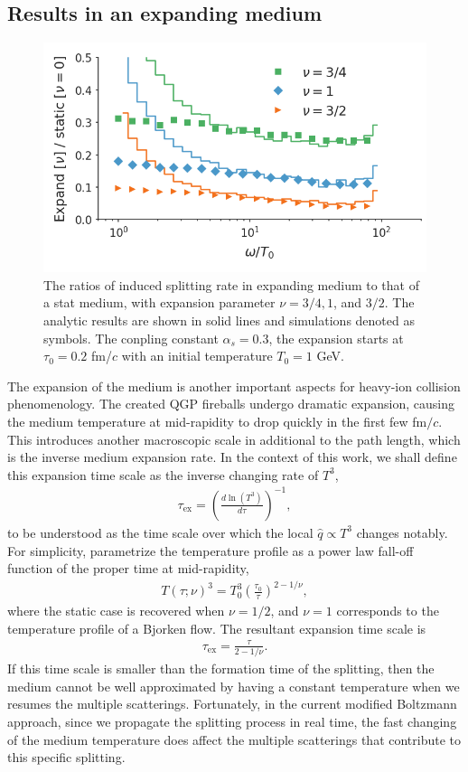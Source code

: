 \documentclass[aps, prc, reprint, amsmath, groupedaddress, nofootinbib]{revtex4-1}
\begin{document}
\subsection{Results in an expanding medium}
\begin{figure}
\includegraphics[width=\columnwidth]{spectrum_Bjorken.png}
\caption{The ratios of induced splitting rate in expanding medium to that of a stat medium, with expansion parameter $\nu = 3/4, 1$, and $3/2$. The analytic results are shown in solid lines and simulations denoted as symbols. The conpling constant $\alpha_s=0.3$, the expansion starts at $\tau_0 = 0.2$ fm/$c$ with an initial temperature $T_0 = 1$ GeV.}
\label{fig:Bjorken-BDMPS}
\end{figure}

The expansion of the medium is another important aspects for heavy-ion collision phenomenology.
The created QGP fireballs undergo dramatic expansion, causing the medium temperature at mid-rapidity to drop quickly in the first few fm$/c$.
This introduces another macroscopic scale in additional to the path length, which is the inverse medium expansion rate. 
In the context of this work, we shall define this expansion time scale as the inverse changing rate of $T^3$,
\begin{eqnarray}
\tau_{\textrm{ex}} = \left(\frac{d\ln(T^3)}{d \tau} \right)^{-1},
\end{eqnarray}
to be understood as the time scale over which the local $\hat{q}\propto T^3$ changes notably.
For simplicity, parametrize the temperature profile as a power law fall-off function of the proper time at mid-rapidity,
\begin{eqnarray}
T(\tau; \nu)^3 = T_0^3\left(\frac{\tau_0}{\tau}\right)^{2-1/\nu},
\end{eqnarray}
where the static case is recovered when $\nu=1/2$, and $\nu=1$ corresponds to the temperature profile of a Bjorken flow.
The resultant expansion time scale is
\begin{eqnarray}
\tau_{\textrm{ex}} = \frac{\tau}{2-1/\nu}.
\end{eqnarray}
If this time scale is smaller than the formation time of the splitting, then the medium cannot be well approximated by having a constant temperature when we resumes the multiple scatterings.
Fortunately, in the current modified Boltzmann approach, since we propagate the splitting process in real time, the fast changing of the medium temperature does affect the multiple scatterings that contribute to this specific splitting.
\end{document}
